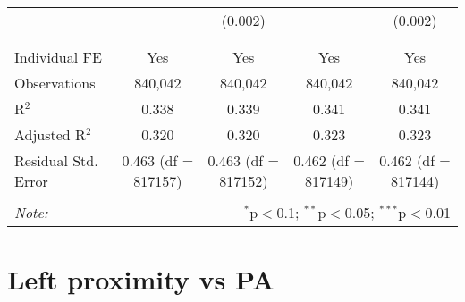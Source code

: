 \documentclass[
]{article}
\begin{document}
\begin{table}[!htbp]
{\begin{tabular}{@{\extracolsep{5pt}}lcccc}
  &  & (0.002) &  & (0.002) \\ 
  & & & & \\ 
\hline \\[-1.8ex] 
Individual FE & Yes & Yes & Yes & Yes \\ 
Observations & 840,042 & 840,042 & 840,042 & 840,042 \\ 
R$^{2}$ & 0.338 & 0.339 & 0.341 & 0.341 \\ 
Adjusted R$^{2}$ & 0.320 & 0.320 & 0.323 & 0.323 \\ 
Residual Std. Error & 0.463 (df = 817157) & 0.463 (df = 817152) & 0.462 (df = 817149) & 0.462 (df = 817144) \\ 
\hline 
\hline \\[-1.8ex] 
\textit{Note:}  & \multicolumn{4}{r}{$^{*}$p$<$0.1; $^{**}$p$<$0.05; $^{***}$p$<$0.01} \\ 
\end{tabular}
} 
\end{table} 
\newpage
\section{Left proximity vs PA}
\end{document}

